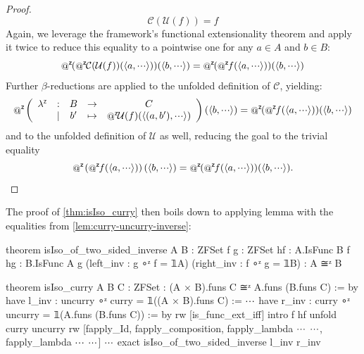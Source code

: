 \begin{proof}
  \begin{equation*}
    \mathcal{C}(\mathcal{U}(f)) = f
  \end{equation*}
  Again, we leverage the framework's functional extensionality theorem and apply it twice to reduce this equality to a pointwise one for any $a \in A$ and $b \in B$:
  \begin{equation*}
    \fapply{(\fapply{\mathcal{C}(\mathcal{U}(f))}{\langle a, \irrelprf \rangle})}{\langle b, \irrelprf \rangle} =
    \fapply{(\fapply{f}{\langle a, \irrelprf \rangle})}{\langle b, \irrelprf \rangle}
  \end{equation*}
  Further $\beta$-reductions are applied to the unfolded definition of $\mathcal{C}$, yielding:
  \begin{equation*}
    \fapply{\left(\zlambda{B}{C}{b'}{\fapply{\mathcal{U}(f)}{\langle (a, b'), \irrelprf \rangle}}\right)}{\langle b, \irrelprf \rangle} =
    \fapply{(\fapply{f}{\langle a, \irrelprf \rangle})}{\langle b, \irrelprf \rangle}
  \end{equation*}
  and to the unfolded definition of $\mathcal{U}$ as well, reducing the goal to the trivial equality
  \[
    \fapply{\left(\fapply{f}{\langle a, \irrelprf \rangle}\right)}{\langle b, \irrelprf \rangle} =
    \fapply{(\fapply{f}{\langle a, \irrelprf \rangle})}{\langle b, \irrelprf \rangle}.
    \vspace*{-\baselineskip}
  \]
\end{proof}

The proof of \cref{thm:isIso_curry} then boils down to applying lemma {\small{}} with the equalities from \cref{lem:curry-uncurry-inverse}:
\begin{leanlisting}
theorem isIso_of_two_sided_inverse {A B : ZFSet} {f g : ZFSet}
  {hf : A.IsFunc B f} {hg : B.IsFunc A g}
  (left_inv : g ∘ᶻ f = 𝟙A) (right_inv : f ∘ᶻ g = 𝟙B) : A ≅ᶻ B
\end{leanlisting}

\begin{leanlisting}[float=t,
  title={Proof skeleton of the currying isomorphism.},
  label=lst:isIso-curry-skel]
theorem isIso_curry {A B C : ZFSet} : (A × B).funs C ≅ᶻ A.funs (B.funs C) := by
  have l_inv : uncurry ∘ᶻ curry = 𝟙((A × B).funs C) := $\irrelprf$
  have r_inv : curry ∘ᶻ uncurry = 𝟙(A.funs (B.funs C)) := by
    rw [is_func_ext_iff]
    intro f hf
    unfold curry uncurry
    rw [fapply_Id, fapply_composition, fapply_lambda $\irrelprf$ $\irrelprf$, fapply_lambda $\irrelprf$ $\irrelprf$]
    $\irrelprf$
  exact isIso_of_two_sided_inverse l_inv r_inv
\end{leanlisting}

